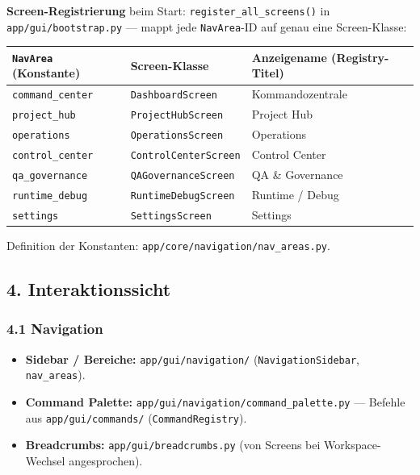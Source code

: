 \textbf{Screen-Registrierung} beim Start: \texttt{register\_all\_screens()} in \texttt{app/gui/bootstrap.py} --- mappt jede \texttt{NavArea}-ID auf genau eine Screen-Klasse:

\begin{center}
\begin{tabular}{lll}
\hline
\texttt{NavArea} (Konstante) & Screen-Klasse & Anzeigename (Registry-Titel) \\
\hline
\texttt{command\_center} & \texttt{DashboardScreen} & Kommandozentrale \\
\texttt{project\_hub} & \texttt{ProjectHubScreen} & Project Hub \\
\texttt{operations} & \texttt{OperationsScreen} & Operations \\
\texttt{control\_center} & \texttt{ControlCenterScreen} & Control Center \\
\texttt{qa\_governance} & \texttt{QAGovernanceScreen} & QA \& Governance \\
\texttt{runtime\_debug} & \texttt{RuntimeDebugScreen} & Runtime / Debug \\
\texttt{settings} & \texttt{SettingsScreen} & Settings \\
\hline
\end{tabular}
\end{center}

Definition der Konstanten: \texttt{app/core/navigation/nav\_areas.py}.

\subsection{4. Interaktionssicht}

\subsubsection{4.1 Navigation}

\begin{itemize}
\item \textbf{Sidebar / Bereiche:} \texttt{app/gui/navigation/} (\texttt{NavigationSidebar}, \texttt{nav\_areas}).
\item \textbf{Command Palette:} \texttt{app/gui/navigation/command\_palette.py} --- Befehle aus \texttt{app/gui/commands/} (\texttt{CommandRegistry}).
\item \textbf{Breadcrumbs:} \texttt{app/gui/breadcrumbs.py} (von Screens bei Workspace-Wechsel angesprochen).
\end{itemize}

